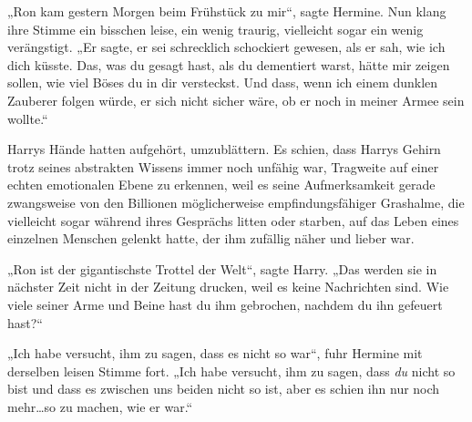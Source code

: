 „Ron kam gestern Morgen beim Frühstück zu mir“, sagte Hermine. Nun klang ihre Stimme ein bisschen leise, ein wenig traurig, vielleicht sogar ein wenig verängstigt.
„Er sagte, er sei schrecklich schockiert gewesen, als er sah, wie ich dich küsste. Das, was du gesagt hast, als du dementiert warst, hätte mir zeigen sollen, wie viel Böses du in dir versteckst. Und dass, wenn ich einem dunklen Zauberer folgen würde, er sich nicht sicher wäre, ob er noch in meiner Armee sein wollte.“

Harrys Hände hatten aufgehört, umzublättern. Es schien, dass Harrys Gehirn trotz seines abstrakten Wissens immer noch unfähig war, Tragweite auf einer echten emotionalen Ebene zu erkennen, weil es seine Aufmerksamkeit gerade zwangsweise von den Billionen möglicherweise empfindungsfähiger Grashalme, die vielleicht sogar während ihres Gesprächs litten oder starben, auf das Leben eines einzelnen Menschen gelenkt hatte, der ihm zufällig näher und lieber war.

„Ron ist der gigantischste Trottel der Welt“, sagte Harry.
„Das werden sie in nächster Zeit nicht in der Zeitung drucken, weil es keine Nachrichten sind. Wie viele seiner Arme und Beine hast du ihm gebrochen, nachdem du ihn gefeuert hast?“

„Ich habe versucht, ihm zu sagen, dass es nicht so war“, fuhr Hermine mit derselben leisen Stimme fort.
„Ich habe versucht, ihm zu sagen, dass \emph{du} nicht so bist und dass es zwischen uns beiden nicht so ist, aber es schien ihn nur noch mehr…so zu machen, wie er war.“

